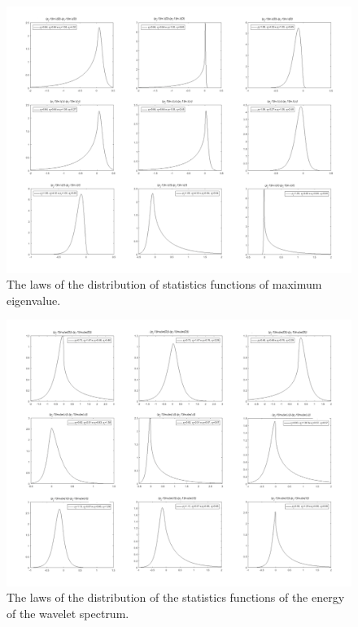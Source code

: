 \begin{figure}[h]
\setcaptionmargin{5mm}
\onelinecaptionstrue
\includegraphics[width=1.0\textwidth]{pics/fig_3.pdf}
\caption{The laws of the distribution of statistics functions of maximum eigenvalue.}\label{fig:fig_3}
\end{figure}

\begin{figure}[h]
\setcaptionmargin{5mm}
\onelinecaptionstrue
\includegraphics[width=1.0\textwidth]{pics/fig_4.pdf}
\caption{The laws of the distribution of the statistics functions of the energy of the wavelet spectrum.}\label{fig:fig_4}
\end{figure}

